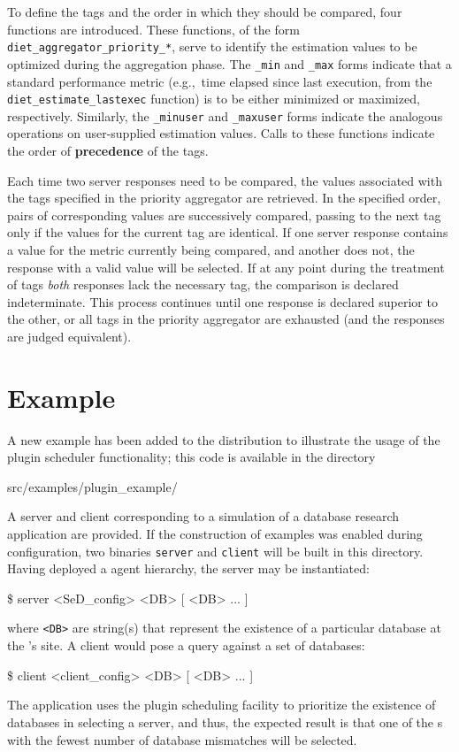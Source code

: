 To define the tags and the order in which they should be compared,
four functions are introduced.  These functions, of the form
\texttt{diet\_aggregator\_priority\_*}, serve to identify the
estimation values to be optimized during the aggregation phase.  The
\texttt{\_min} and \texttt{\_max} forms indicate that a standard
performance metric (e.g.,~time elapsed since last execution, from the
\texttt{diet\_estimate\_lastexec} function) is to be either
minimized or maximized, respectively.  Similarly, the
\texttt{\_minuser} and \texttt{\_maxuser} forms indicate the analogous
operations on user-supplied estimation values.  Calls to these
functions indicate the order of \textbf{precedence} of the tags.

Each time two server responses need to be compared, the values
associated with the tags specified in the priority aggregator are
retrieved.  In the specified order, pairs of corresponding values are
successively compared, passing to the next tag only if the values for
the current tag are identical.  If one server response contains a
value for the metric currently being compared, and another does not,
the response with a valid value will be selected.  If at any point
during the treatment of tags \emph{both} responses lack the necessary
tag, the comparison is declared indeterminate.
This process continues until one response is
declared superior to the other, or all tags in the priority aggregator
are exhausted (and the responses are judged equivalent).


\section{Example}

A new example has been added to the \diet distribution to illustrate
the usage of the plugin scheduler functionality; this code is
available in the directory
\begin{code}
src/examples/plugin\_example/
\end{code}
A \diet server and client corresponding to a simulation of a
database research application are provided.  If the construction of
examples was enabled during \diet configuration, two binaries
\texttt{server} and \texttt{client} will be built in this directory.
Having deployed a \diet agent hierarchy, the server may be
instantiated:
\begin{code}
  \$ server <SeD\_config> <DB> [ <DB> ... ]
\end{code}
where \texttt{<DB>} are string(s) that represent the existence of
a particular database at the {\sed}'s site.  A client would pose a query
against a set of databases:
\begin{code}
  \$ client <client\_config> <DB> [ <DB> ... ]
\end{code}
The application uses the plugin scheduling facility to prioritize the
existence of databases in selecting a server, and thus, the expected
result is that one of the {\sed}s with the fewest number of database
mismatches will be selected.

